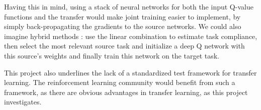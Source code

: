 \documentclass{article}
\begin{document}
Having this in mind, using a stack of neural networks for both the input Q-value functions and the transfer would make joint training easier to implement, by simply back-propagating the gradients to the source networks. We could also imagine hybrid methods :  use the linear combination to estimate task compliance, then select the most relevant source task and initialize a deep Q network with this source's weights and finally train this network on the target task.

This project also underlines the lack of a standardized test framework for transfer learning. The reinforcement learning community would benefit from such a framework, as there are obvious advantages in transfer learning, as this project investigates. 

\nocite{*}
\footnotesize


\end{document}
